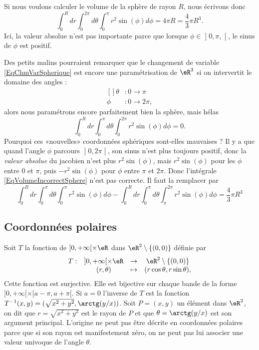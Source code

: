 Si nous voulons calculer le volume de la sphère de rayon $R$, nous écrivons donc
\begin{equation}
	\int_0^Rdr\int_{0}^{2\pi}d\theta\int_0^{\pi}r^2 \sin(\phi)d\phi=4\pi R=\frac{ 4 }{ 3 }\pi R^3.
\end{equation}
Ici, la valeur absolue n'est pas importante parce que lorsque $\phi\in\mathopen] 0,\pi ,  \mathclose[$, le sinus de $\phi$ est positif.

Des petits malins pourraient remarquer que le changement de variable \eqref{EqChmVarSpherique} est encore une paramétrisation de $\eR^3$ si on intervertit le domaine des angles : 
\begin{equation}
	\begin{aligned}[]
		\theta&\colon 0 \to \pi\\
		\phi	&\colon 0\to 2\pi,
	\end{aligned}
\end{equation}
alors nous paramétrons encore parfaitement bien la sphère, mais hélas
\begin{equation}		\label{EqVolumeIncorrectSphere}
	\int_0^Rdr\int_{0}^{\pi}d\theta\int_0^{2\pi}r^2 \sin(\phi)d\phi=0.
\end{equation}
Pourquoi ces «nouvelles» coordonnées sphériques sont-elles mauvaises ? Il y a que quand l'angle $\phi$ parcours $\mathopen] 0 , 2\pi \mathclose[$, son sinus n'est plus toujours positif, donc la \emph{valeur absolue} du jacobien n'est plus $r^2\sin(\phi)$, mais $r^2\sin(\phi)$ pour les $\phi$ entre $0$ et $\pi$, puis $-r^2\sin(\phi)$ pour $\phi$ entre $\pi$ et $2\pi$. Donc l'intégrale \eqref{EqVolumeIncorrectSphere} n'est pas correcte. Il faut la remplacer par
\begin{equation}
	\int_0^Rdr\int_{0}^{\pi}d\theta\int_0^{\pi}r^2 \sin(\phi)d\phi- \int_0^Rdr\int_{0}^{\pi}d\theta\int_{\pi}^{2\pi}r^2 \sin(\phi)d\phi = \frac{ 4 }{ 3 }\pi R^3
\end{equation}

\subsection{Coordonnées polaires}
Soit $T$ la fonction de $]0, +\infty[\times \eR$ dans $\eR^2\setminus\{(0,0)\}$ définie par
\begin{equation}
  \begin{array}{lccc}
    T: &]0, +\infty[\times \eR & \to & \eR^2\setminus\{(0,0)\}\\
 & (r, \theta)&\mapsto& (r\cos \theta, r \sin \theta),
  \end{array}
\end{equation}
Cette fonction est surjective. Elle est bijective sur chaque bande de la forme  $]0, +\infty[\times [a-\pi,a+\pi[$. Si $a=0$ l'inverse de $T$  est la fonction $T^{-1}(x,y)= (\sqrt{x^2+y^2}, \arctg (y/x))$. Soit $P=(x,y)$ un élément dans $\eR^2$, on dit que $r=\sqrt{x^2+y^2}$ est le rayon de $P$ et que $\theta=\arctg (y/x) $ est son argument principal. L'origine ne peut pas être décrite en coordonnées polaires parce que si son rayon est manifestement zéro, on ne peut pas lui associer une valeur univoque de l'angle $\theta$. 


